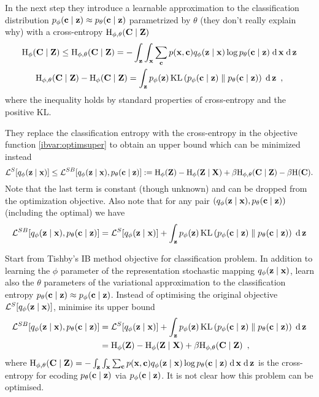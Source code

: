 In the next step they introduce a learnable approximation to the classification distribution $p_\phi(\bc \mid \bz) \approx \ptc$ parametrized by $\theta$ (they don't really explain why) with a cross-entropy $\rH_{\phi, \theta}(\bC \mid \bZ)$
\begin{gather}
\rH_\phi(\bC \mid \bZ) \leq \rH_{\phi, \theta}(\bC \mid \bZ)
= - \int_\bz \int_\bx \sum_\bc p(\bx, \bc) \qfz \log \ptc \dif \bx \dif \bz 
\nn
\rH_{\phi, \theta}(\bC \mid \bZ) - \rH_\phi(\bC \mid \bZ) =
\int_\bz p_\phi(\bz) \KL{p_\phi(\bc \mid \bz)}{\ptc} \dif \bz
\enspace ,
\end{gather}
where the inequality holds by standard properties of cross-entropy and the positive KL.

They replace the classification entropy with the cross-entropy in the objective function \ref{ibvar:optimsuper} to obtain an upper bound which can be minimized instead
\begin{equation}
\mL^S[\qfz] \leq \mL^{SB}[\qfz, \ptc] := \rH_\phi(\bZ) - \rH_\phi(\bZ \mid \bX) + \beta \rH_{\phi, \theta}(\bC \mid \bZ) - \beta \rH(\bC) .
\end{equation}
Note that the last term is constant (though unknown) and can be dropped from the optimization objective.
Also note that for any pair $(\qfz, \ptc)$ (including the optimal) we have
\begin{equation}
\mL^{SB}[\qfz, \ptc] = \mL^S[\qfz] + \int_\bz p_\phi(\bz) \KL{p_\phi(\bc \mid \bz)}{\ptc} \dif \bz
\end{equation}

\begin{notebox}
\tldr Start from Tishby's IB method objective for classification problem.
In addition to learning the $\phi$ parameter of the representation stochastic mapping $\qfz$, learn also the $\theta$ parameters of the variational approximation to the classification entropy $\ptc \approx p_\phi(\bc \mid \bz)$.
Instead of optimising the original objective $\mL^S[\qfz]$, minimise its upper bound 
\begin{align}
\mL^{SB}[\qfz, \ptc] & = \mL^S[\qfz] + \int_\bz p_\phi(\bz) \KL{p_\phi(\bc \mid \bz)}{\ptc} \dif \bz \nn
& = \rH_\phi(\bZ) - \rH_\phi(\bZ \mid \bX) + \beta \rH_{\phi, \theta}(\bC \mid \bZ) \nonumber \enspace ,
\end{align}
where $\rH_{\phi, \theta}(\bC \mid \bZ)
= - \int_\bz \int_\bx \sum_\bc p(\bx, \bc) \qfz \log \ptc \dif \bx \dif \bz$ is the cross-entropy for ecoding $\ptc$ via $p_\phi(\bc \mid \bz)$.
It is not clear how this problem can be optimised. 
\end{notebox}


